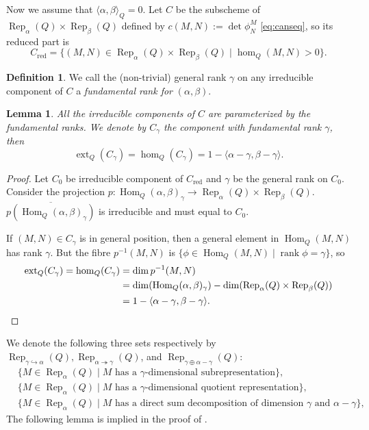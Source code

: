 \documentclass{amsart}
\newtheorem{lemma}[theorem]{Lemma}
\theoremstyle{definition}
\newtheorem{definition}[theorem]{Definition}
\theoremstyle{remark}
\numberwithin{equation}{section}
\begin{document}
Now we assume that ${\langle{\alpha,\beta}\rangle}_Q=0$. Let $C$ be the subscheme of ${\operatorname{Rep}}_\alpha(Q)\times{\operatorname{Rep}}_\beta(Q)$ defined by $c(M,N):=\det\phi_N^M$ \eqref{eq:canseq}, so its reduced part is $$C_{\operatorname{red}}=\{(M,N)\in{\operatorname{Rep}}_\alpha(Q)\times{\operatorname{Rep}}_\beta(Q)\mid\hom_Q(M,N)>0\}.$$
\begin{definition}
We call the (non-trivial) general rank $\gamma$ on any irreducible component of $C$ a {\em fundamental rank for} $(\alpha,\beta)$.
\end{definition}

\begin{lemma} \label{L:frank} All the irreducible components of $C$ are parameterized by the fundamental ranks. We denote by $C_\gamma$ the component with fundamental rank $\gamma$, then
\begin{equation} \label{eq:dimhomC} {\operatorname{ext}}_Q(C_\gamma)=\hom_Q(C_\gamma)=1-{\langle{\alpha-\gamma,\beta-\gamma}\rangle}. \end{equation}
\end{lemma}

\begin{proof}
Let $C_0$ be irreducible component of $C_{\operatorname{red}}$ and $\gamma$ be the general rank on $C_0$. Consider the projection $p:{\operatorname{Hom}}_Q(\alpha,\beta)_\gamma\to {\operatorname{Rep}}_\alpha(Q)\times{\operatorname{Rep}}_\beta(Q)$. $\overline{p({\operatorname{Hom}}_Q(\alpha,\beta)_\gamma)}$ is irreducible and must equal to $C_0$.

If $(M,N)\in C_\gamma$ is in general position, then a general element in ${\operatorname{Hom}}_Q(M,N)$ has rank $\gamma$. But the fibre $p^{-1}(M,N)$ is $\{\phi\in{\operatorname{Hom}}_Q(M,N)\mid {\operatorname{rank}}\phi=\gamma\}$, so
\begin{align*}
{\operatorname{ext}}_Q(C_\gamma)=\hom_Q(C_\gamma)& =\dim p^{-1}(M,N)\\
& =\dim({\operatorname{Hom}}_Q(\alpha,\beta)_\gamma)-\dim({\operatorname{Rep}}_\alpha(Q)\times{\operatorname{Rep}}_\beta(Q))\notag\\
& =1-{\langle{\alpha-\gamma,\beta-\gamma}\rangle}.
\end{align*}
\end{proof}

We denote the following three sets respectively by ${\operatorname{Rep}}_{\gamma\hookrightarrow\alpha}(Q),{\operatorname{Rep}}_{\alpha\twoheadrightarrow\gamma}(Q)$, and ${\operatorname{Rep}}_{\gamma\oplus\alpha-\gamma}(Q)$:
\begin{align*}
&\{M\in{\operatorname{Rep}}_\alpha(Q)\mid M\text{ has a $\gamma$-dimensional subrepresentation}\},\\
&\{M\in{\operatorname{Rep}}_\alpha(Q)\mid M\text{ has a $\gamma$-dimensional quotient representation}\},\\
&\{M\in{\operatorname{Rep}}_\alpha(Q)\mid M\text{ has a direct sum decomposition of dimension $\gamma$ and $\alpha-\gamma$}\},
\end{align*}
The following lemma is implied in the proof of \cite[Theorem 2.1, 3.3]{S2}.
\end{document}
